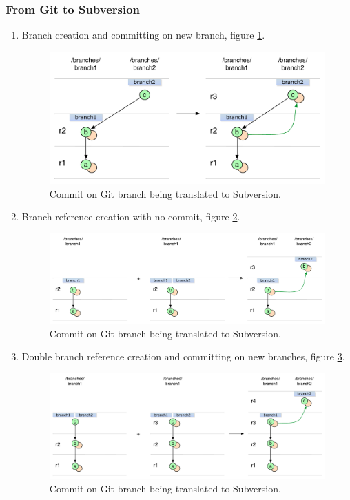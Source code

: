 \subsubsection{From Git to Subversion}

\begin{enumerate}
\compactlist
\item Branch creation and committing on new branch, figure \ref{branch_creation_git_to_svn}.

\begin{figure}[!h]
\centering
\includegraphics[width=\linewidth]{img/diagrams/branch_creation_git_to_svn.pdf}
\caption{Commit on Git branch being translated to Subversion.}
\label{branch_creation_git_to_svn}
\end{figure}

\item Branch reference creation with no commit, figure \ref{svn_no_change_branch_creation_git_to_svn}.

\begin{figure}[!h]
\centering
\includegraphics[width=\linewidth]{img/diagrams/svn_no_change_branch_creation_git_to_svn.pdf}
\caption{Commit on Git branch being translated to Subversion.}
\label{svn_no_change_branch_creation_git_to_svn}
\end{figure}

\item Double branch reference creation and committing on new branches, figure \ref{ambiguous_svn_branch_git_to_svn}.

\begin{figure}[!h]
\centering
\includegraphics[width=\linewidth]{img/diagrams/ambiguous_svn_branch_git_to_svn.pdf}
\caption{Commit on Git branch being translated to Subversion.}
\label{ambiguous_svn_branch_git_to_svn}
\end{figure}

\end{enumerate}
